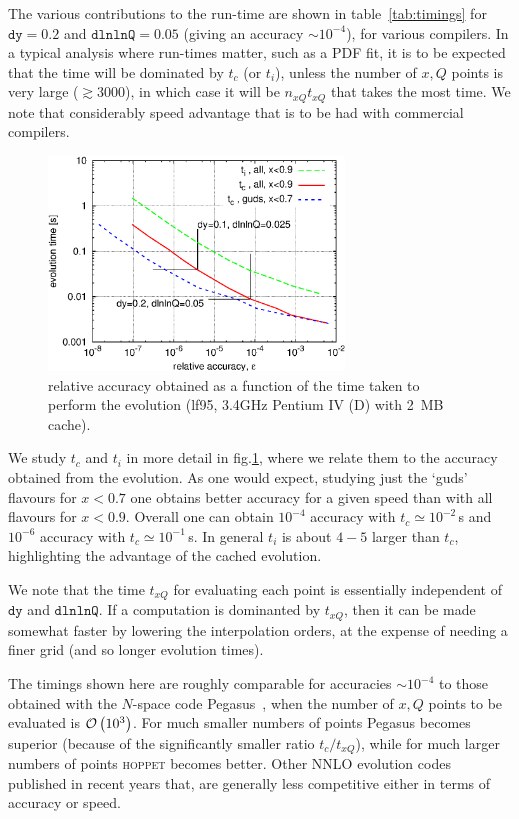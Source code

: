 \documentclass[12pt]{article}
\newcommand{\dy}{\ttt{dy}}
\newcommand{\dlnlnQ}{\ttt{dlnlnQ}}
\newcommand{\hoppet}{\textsc{hoppet}\xspace}
\newcommand{\ttt}[1]{\texttt{#1}}
\newcommand{\order}[1]{{\cal O}\left(#1\right)}
\begin{document}
The various contributions to the run-time are shown in
table~\ref{tab:timings} for $\dy=0.2$ and $\dlnlnQ=0.05$ (giving an
accuracy $\sim 10^{-4}$), for various compilers.  In a typical
analysis where run-times matter, such as a PDF fit, it is to be
expected that the time will be dominated by $t_c$ (or $t_i$), unless
the number of $x,Q$ points is very large ($\gtrsim 3000$), in which
case it will be $n_{xQ} t_{xQ}$ that takes the most time. We note that
considerably speed advantage that is to be had with commercial
compilers.

\begin{figure}
  \centering
  \includegraphics[width=0.7\textwidth]{../benchmarking/test_acc/acc-v-time.eps}%
  \caption{relative accuracy obtained as a function of the time taken
    to perform the evolution (lf95, 3.4GHz Pentium IV (D) with 2~MB
    cache).}
  \label{fig:acc-v-time}
\end{figure}

We study $t_c$ and $t_i$ in more detail in fig.\ref{fig:acc-v-time},
where we relate them to the accuracy obtained from the evolution. As
one would expect, studying just the `guds' flavours for $x<0.7$ one
obtains better accuracy for a given speed than with all flavours for
$x<0.9$. Overall one can obtain $10^{-4}$ accuracy with $t_c \simeq
10^{-2}$\,s and $10^{-6}$ accuracy with $t_c \simeq 10^{-1}$\,s. In
general $t_i$ is about $4-5$ larger than $t_c$, highlighting the
advantage of the cached evolution. 

We note that the time $t_{xQ}$ for evaluating each point is
essentially independent of $\dy$ and $\dlnlnQ$. If a computation is
dominanted by $t_{xQ}$, then it can be made somewhat faster by
lowering the interpolation orders, at the expense of needing a finer
grid (and so longer evolution times).

The timings shown here are roughly comparable for accuracies $\sim
10^{-4}$ to those obtained with the $N$-space code
Pegasus~\cite{Pegasus}, when the number of $x,Q$ points to be
evaluated is $\order{10^3}$. For much smaller numbers of points
Pegasus becomes superior (because of the significantly smaller ratio
$t_c/t_{xQ}$), while for much larger numbers of points \hoppet becomes
better. Other NNLO evolution codes published in recent years that,
\cite{Weinzierl:2002mv,coriano,Botje} are generally less competitive
either in terms of accuracy or speed.
\end{document}
